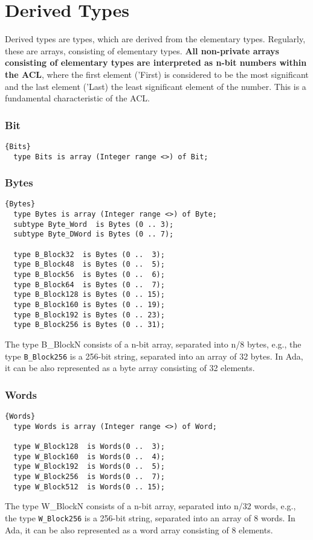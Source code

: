 
\section{Derived Types}
Derived types are types, which are derived from the elementary
types. Regularly, these are arrays, consisting of elementary
types. \textbf{All non-private arrays consisting of elementary types
  are interpreted as n-bit numbers within the ACL}, where the first
element ('First) is considered to be the most significant and the last
element ('Last) the least significant element of the number. This is a
fundamental characteristic of the ACL.
\subsubsection*{Bit}
\begin{lstlisting}{Bits}
  type Bits is array (Integer range <>) of Bit;
\end{lstlisting}
\subsubsection*{Bytes}
\begin{lstlisting}{Bytes}
  type Bytes is array (Integer range <>) of Byte;
  subtype Byte_Word  is Bytes (0 .. 3);
  subtype Byte_DWord is Bytes (0 .. 7);

  type B_Block32  is Bytes (0 ..  3);
  type B_Block48  is Bytes (0 ..  5);
  type B_Block56  is Bytes (0 ..  6);
  type B_Block64  is Bytes (0 ..  7);
  type B_Block128 is Bytes (0 .. 15);
  type B_Block160 is Bytes (0 .. 19);
  type B_Block192 is Bytes (0 .. 23);
  type B_Block256 is Bytes (0 .. 31);
\end{lstlisting}
The type B\_BlockN consists of a n-bit array, separated into n/8
bytes, e.g., the type \texttt{B\_Block256} is a 256-bit string,
separated into an array of 32 bytes. In Ada, it can be also
represented as a byte array consisting of 32 elements.

\hhline
\subsubsection*{Words}
\begin{lstlisting}{Words}
  type Words is array (Integer range <>) of Word;
  
  type W_Block128  is Words(0 ..  3);
  type W_Block160  is Words(0 ..  4);
  type W_Block192  is Words(0 ..  5);
  type W_Block256  is Words(0 ..  7);
  type W_Block512  is Words(0 .. 15);
\end{lstlisting}
The type W\_BlockN consists of a n-bit array, separated into n/32
words, e.g., the type \texttt{W\_Block256} is a 256-bit string,
separated into an array of 8 words. In Ada, it can be also represented
as a word array consisting of 8 elements.


